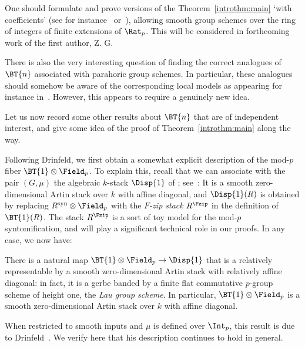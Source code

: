 \documentclass[10pt]{amsart}
\begin{document}
\begin{introrem}
\label{introrem:parahoric}
One should formulate and prove versions of the Theorem~\ref{introthm:main} `with coefficients' (see for instance~\cite{ito2023deformation} or~\cite{marks2023prismatic}), allowing smooth group schemes over the ring of integers of finite extensions of $\Rat_p$. This will be considered in forthcoming work of the first author, Z. G. 

There is also the very interesting question of finding the correct analogues of $\BT{n}$ associated with parahoric group schemes. In particular, these analogues should somehow be aware of the corresponding local models as appearing for instance in~\cite{anschutz2022padictheorylocalmodels}. However, this appears to require a genuinely new idea.
\end{introrem}

Let us now record some other results about $\BT{n}$ that are of independent interest, and give some idea of the proof of Theorem~\ref{introthm:main} along the way. 


Following Drinfeld, we first obtain a somewhat explicit description of the mod-$p$ fiber $\BT{1}\otimes\Field_p$. To explain this, recall that we can associate with the pair $(G,\mu)$ the algebraic $k$-stack $\Disp{1}$ of ; see~\cite{Pink2015-ye}: It is a smooth zero-dimensional Artin stack over $k$ with affine diagonal, and $\Disp{1}(R)$ is obtained by replacing $R^{\mathrm{syn}}\otimes\Field_p$ with the \emph{$F$-zip stack} $R^{\Fzip}$ in the definition of $\BT{1}(R)$. The stack $R^{\Fzip}$ is a sort of toy model for the mod-$p$ syntomification, and will play a significant technical role in our proofs. In any case, we now have:


\begin{introthm}\label{introthm:map_to_f-zips}
There is a natural map $\BT{1}\otimes \Field_p\to \Disp{1}$ that is a relatively representable by a smooth zero-dimensional Artin stack with relatively affine diagonal: in fact, it is a gerbe banded by a finite flat commutative $p$-group scheme of height one, the \emph{Lau group scheme}. In particular, $\BT{1}\otimes\Field_p$ is a smooth zero-dimensional Artin stack over $k$ with affine diagonal.
\end{introthm}

\begin{introrem}
When restricted to smooth inputs and $\mu$ is defined over $\Int_p$, this result is due to Drinfeld~\cite{drinfeld2023shimurian}. We verify here that his description continues to hold in general.
\end{introrem}
\end{document}
